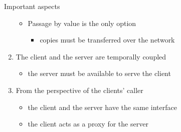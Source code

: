 \documentclass[presentation]{beamer}\mode<presentation>{\usetheme{AMSBolognaFC}}
\begin{document}
\begin{frame}[allowframebreaks]
\begin{alertblock}{Important aspects}
\begin{enumerate}
\begin{itemize}
                \item Passage by value is the only option
                \begin{itemize}
                    \item copies must be transferred over the network
                \end{itemize}
            \end{itemize}

            \item The client and the server are temporally coupled
            \begin{itemize}
                \item the server must be available to serve the client
            \end{itemize}

            \item From the perspective of the clients' caller
            \begin{itemize}
                \item the client and the server have the same interface
                \item the client acts as a proxy for the server
            \end{itemize}
        \end{enumerate}
    \end{alertblock}

\end{frame}
\end{document}
